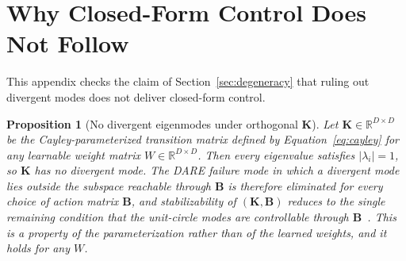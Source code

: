 \documentclass[10pt]{article} %
\newtheorem{proposition}{Proposition}
\newcommand{\K}{\mathbf{K}}
\newcommand{\B}{\mathbf{B}}
\begin{document}
\section{Why Closed-Form Control Does Not Follow}
\label{app:lqr}
This appendix checks the claim of Section~\ref{sec:degeneracy} that ruling out divergent modes does not deliver closed-form control.

\begin{proposition}[No divergent eigenmodes under orthogonal $\K$]
\label{prop:cayley-stab}
Let $\K \in \mathbb{R}^{D\times D}$ be the Cayley-parameterized transition matrix defined by Equation~\ref{eq:cayley} for any learnable weight matrix $W \in \mathbb{R}^{D\times D}$. Then every eigenvalue satisfies $|\lambda_i| = 1$, so $\K$ has no divergent mode. The DARE failure mode in which a divergent mode lies outside the subspace reachable through $\B$ is therefore eliminated for every choice of action matrix $\B$, and stabilizability of $(\K, \B)$ reduces to the single remaining condition that the unit-circle modes are controllable through $\B$~\citep{Lancaster1995}. This is a property of the parameterization rather than of the learned weights, and it holds for any $W$.
\end{proposition}
\end{document}
